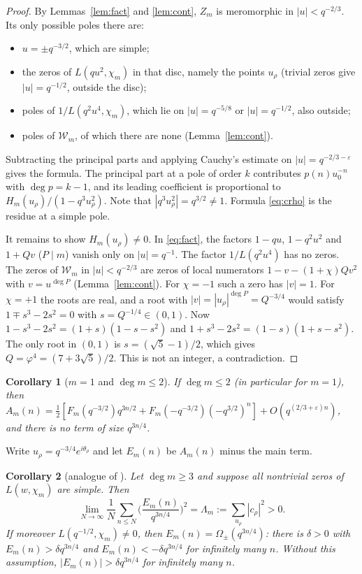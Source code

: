 \documentclass[11pt]{amsart}
\newtheorem{corollary}{Corollary}
\theoremstyle{remark}
\begin{document}
\begin{proof}
By Lemmas~\ref{lem:fact} and \ref{lem:cont}, $Z_m$ is meromorphic in $|u|<q^{-2/3}$. Its only possible poles there are:
\begin{itemize}
\item $u=\pm q^{-3/2}$, which are simple;
\item the zeros of $L(qu^2,\chi_m)$ in that disc, namely the points $u_\rho$ (trivial zeros give $|u|=q^{-1/2}$, outside the disc);
\item poles of $1/L(q^2u^4,\chi_m)$, which lie on $|u|=q^{-5/8}$ or $|u|=q^{-1/2}$, also outside;
\item poles of $\mathcal W_m$, of which there are none (Lemma~\ref{lem:cont}).
\end{itemize}
Subtracting the principal parts and applying Cauchy's estimate on $|u|=q^{-2/3-\varepsilon}$ gives the formula. The principal part at a pole of order $k$ contributes $p(n)u_0^{-n}$ with $\deg p=k-1$, and its leading coefficient is proportional to $H_m(u_\rho)/(1-q^3u_\rho^2)$. Note that $|q^3u_\rho^2|=q^{3/2}\ne1$. Formula \eqref{eq:crho} is the residue at a simple pole.

It remains to show $H_m(u_\rho)\neq0$. In \eqref{eq:fact}, the factors $1-qu$, $1-q^2u^2$ and $1+Qv$ ($P\mid m$) vanish only on $|u|=q^{-1}$. The factor $1/L(q^2u^4)$ has no zeros. The zeros of $\mathcal W_m$ in $|u|<q^{-2/3}$ are zeros of local numerators $1-v-(1+\chi)Qv^2$ with $v=u^{\deg P}$ (Lemma~\ref{lem:cont}). For $\chi=-1$ such a zero has $|v|=1$. For $\chi=+1$ the roots are real, and a root with $|v|=|u_\rho|^{\deg P}=Q^{-3/4}$ would satisfy $1\mp s^3-2s^2=0$ with $s=Q^{-1/4}\in(0,1)$. Now $1-s^3-2s^2=(1+s)(1-s-s^2)$ and $1+s^3-2s^2=(1-s)(1+s-s^2)$. The only root in $(0,1)$ is $s=(\sqrt5-1)/2$, which gives $Q=\varphi^4=(7+3\sqrt5)/2$. This is not an integer, a contradiction.
\end{proof}

\begin{corollary}[$m=1$ and $\deg m\le2$]\label{cor:m1}
If $\deg m\le2$ (in particular for $m=1$), then $A_m(n)=\tfrac12[F_m(q^{-3/2})q^{3n/2}+F_m(-q^{-3/2})(-q^{3/2})^n]+O(q^{(2/3+\varepsilon)n})$, and there is no term of size $q^{3n/4}$.
\end{corollary}

Write $u_\rho=q^{-3/4}e^{i\theta_\rho}$ and let $E_m(n)$ be $A_m(n)$ minus the main term.

\begin{corollary}[analogue of {\cite[Thms.~B, C]{K}}]\label{cor:ms}
Let $\deg m\ge3$ and suppose all nontrivial zeros of $L(w,\chi_m)$ are simple. Then
\[
\lim_{N\to\infty}\frac1N\sum_{n\le N}\Big(\frac{E_m(n)}{q^{3n/4}}\Big)^2=\Lambda_m:=\sum_{u_\rho}|c_\rho|^2>0 .
\]
If moreover $L(q^{-1/2},\chi_m)\neq0$, then $E_m(n)=\Omega_\pm(q^{3n/4})$: there is $\delta>0$ with $E_m(n)>\delta q^{3n/4}$ and $E_m(n)<-\delta q^{3n/4}$ for infinitely many $n$. Without this assumption, $|E_m(n)|>\delta q^{3n/4}$ for infinitely many $n$.
\end{corollary}
\end{document}
